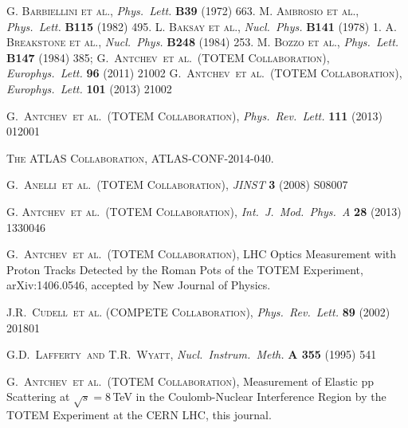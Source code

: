 \documentclass[3p,twocolumn]{elsarticle}
\def\etal{et al.}
\def\Name#1{\textsc{#1}, }
\def\REVIEW#1#2#3#4{{\it #1} {\bf #2} (#3) #4}
\begin{document}
\begin{thebibliography}{99}
%
 \Name{G. Barbiellini et al.} \REVIEW{Phys.~Lett.}{B39}{1972}{663}.
 \Name{M. Ambrosio et al.} \REVIEW{Phys.~Lett.}{B115}{1982}{495}.
 \Name{L. Baksay et al.} \REVIEW{Nucl.~Phys.}{B141}{1978}{1}.
 \Name{A. Breakstone et al.} \REVIEW{Nucl.~Phys.}{B248}{1984}{253}.
 \Name{M. Bozzo et al.} \REVIEW{Phys.~Lett.}{B147}{1984}{385}; 
	\Name{G.~Antchev~\etal{}~(TOTEM Collaboration)}
	\REVIEW{Europhys.~Lett.}{96}{2011}{21002}
	\Name{G.~Antchev~\etal{}~(TOTEM Collaboration)}
	\REVIEW{Europhys.~Lett.}{101}{2013}{21002}


	\Name{G.~Antchev~\etal{}~(TOTEM Collaboration)}
	\REVIEW{Phys.~Rev.~Lett.}{111}{2013}{012001}

 \Name{The ATLAS Collaboration} ATLAS-CONF-2014-040.

	\Name{G.~Anelli~\etal{}~(TOTEM Collaboration)}
	\REVIEW{JINST}{3}{2008}{S08007}


	\Name{G. Antchev~\etal{}~(TOTEM Collaboration)}
	\REVIEW{Int.~J.~Mod.~Phys.~A}{28}{2013}{1330046}

	\Name{G.~Antchev~\etal{}~(TOTEM Collaboration)}
	LHC Optics Measurement with Proton Tracks Detected by the Roman Pots of the TOTEM Experiment, 
	arXiv:1406.0546, accepted by New Journal of Physics.

	\Name{J.R.~Cudell~\etal{} (COMPETE Collaboration)}
	\REVIEW{Phys.\ Rev.\ Lett.}{89}{2002}{201801}

	\Name{G.D.~Lafferty~and T.R.~Wyatt}
	\REVIEW{Nucl.\ Instrum.\ Meth.}{A 355}{1995}{541}

 \Name{G.~Antchev~\etal{}~(TOTEM Collaboration)}
        Measurement of Elastic pp Scattering at $\sqrt{s}=8\,$TeV in the 
        Coulomb-Nuclear Interference Region by the TOTEM Experiment at the 
        CERN LHC, this journal.


\end{thebibliography}
\end{document}
